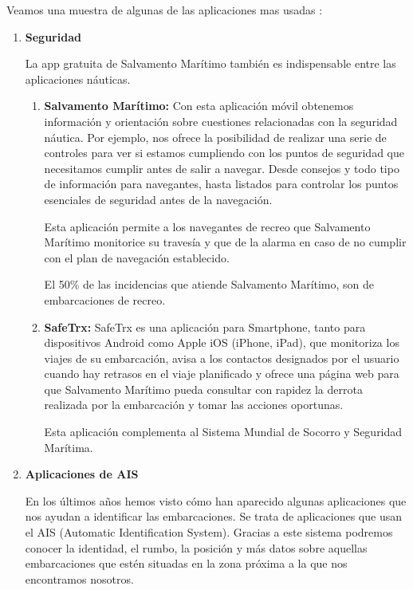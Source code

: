  

Veamos una muestra de algunas de las aplicaciones mas usadas :
\begin{enumerate}
\item  \textbf{Seguridad}

 La app gratuita de Salvamento Marítimo también es indispensable entre las aplicaciones náuticas.
\begin{enumerate}
\item \textbf{Salvamento Marítimo:} Con esta aplicación móvil obtenemos información y orientación sobre cuestiones relacionadas con la seguridad náutica. Por ejemplo, nos ofrece la posibilidad de realizar una serie de controles para ver si estamos cumpliendo con los puntos de seguridad que necesitamos cumplir antes de salir a navegar. Desde consejos y todo tipo de información para navegantes, hasta listados para controlar los puntos esenciales de seguridad antes de la navegación.

Esta  aplicación  permite a los navegantes de recreo que Salvamento Marítimo monitorice su travesía y que de la alarma en caso de no cumplir con el plan de navegación establecido.

El 50\% de las incidencias que atiende Salvamento Marítimo, son de embarcaciones de recreo.

\item \textbf{SafeTrx:} 
SafeTrx es una aplicación para Smartphone, tanto para dispositivos Android como Apple iOS (iPhone, iPad), que monitoriza los viajes de su embarcación, avisa a los contactos designados por el usuario cuando hay retrasos en el viaje planificado y ofrece una página web para que Salvamento Marítimo pueda consultar con rapidez la derrota realizada por la embarcación y tomar las acciones oportunas.

Esta aplicación complementa al Sistema Mundial de Socorro y Seguridad Marítima.
\end{enumerate}

\item  \textbf{Aplicaciones de AIS}

En los últimos años hemos visto cómo han aparecido algunas aplicaciones que nos ayudan a identificar las embarcaciones. Se trata de aplicaciones que usan el AIS (Automatic Identification System). Gracias a este sistema podremos conocer la identidad, el rumbo, la posición y más datos sobre aquellas embarcaciones que estén situadas en la zona próxima a la que nos encontramos nosotros.


\end{enumerate}

